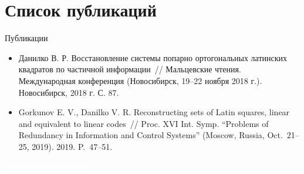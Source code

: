 \documentclass[8pt, hyperref={pdftex,unicode}]{beamer}
\begin{document}
\section{Список публикаций}
\begin{frame}{Публикации}

    \begin{block}{}
        \begin{itemize}
            \item Данилко В. Р. Восстановление системы попарно ортогональных латинских квадратов по частичной информации~// Мальцевские чтения. Международная конференция (Новосибирск, 19--22 ноября 2018 г.). Новосибирск, 2018 г. С. 87.
            \item Gorkunov E. V., Danilko V. R. Reconstructing sets of Latin squares, linear and equivalent to linear codes~//
                  Proc. XVI Int. Symp. ``Problems of Redundancy in Information and Control Systems'' (Moscow, Russia, Oct.~21--25, 2019). 2019. P.~47--51.
        \end{itemize}
    \end{block}

\end{frame}



\begin{frame}[standout]

    \Huge\centering
    \textcolor{white}{\bf Спасибо за внимание!}

\end{frame}
\end{document}
